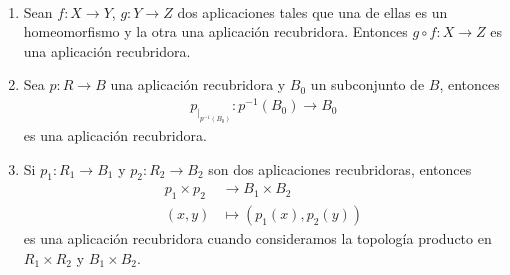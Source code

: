 \begin{propiedades}\
    \begin{enumerate}
        \item Sean $f:X\to Y$, $g:Y\to Z$ dos aplicaciones tales que una de ellas es un homeomorfismo y la otra una aplicación recubridora. Entonces $g\circ f : X\to Z$ es una aplicación recubridora.

        \item Sea $p:R\to B$ una aplicación recubridora y $B_0$ un subconjunto de $B$, entonces
        \begin{align*}
            p_{|_{p^{-1}(B_0)}}:p^{-1}(B_0) \to B_0
        \end{align*}
        es una aplicación recubridora.

        \item Si $p_1:R_1\to B_1$ y $p_2:R_2\to B_2$ son dos aplicaciones recubridoras, entonces
        \begin{align*}
            p_1\times p_2 & \to B_1\times B_2\\
            (x,y) &\mapsto (p_1(x), p_2(y))
        \end{align*}
        es una aplicación recubridora cuando consideramos la topología producto en $R_1\times R_2$ y $B_1\times B_2$. 
    \end{enumerate}
\end{propiedades}

